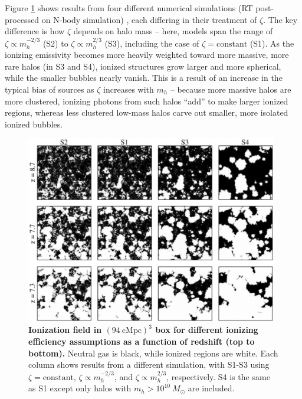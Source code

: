 Figure \ref{fig:mcquinn} shows results from four different numerical simulations (RT post-processed on N-body simulation) \cite{McQuinn2007}, each differing in their treatment of $\zeta$. The key difference is how $\zeta$ depends on halo mass -- here, models span the range of $\zeta \propto m_h^{-2/3}$ (S2) to $\zeta \propto m_h^{2/3}$ (S3), including the case of $\zeta = \mathrm{constant}$ (S1). As the ionizing emissivity becomes more heavily weighted toward more massive, more rare halos (in S3 and S4), ionized structures grow larger and more spherical, while the smaller bubbles nearly vanish. This is a result of an increase in the typical bias of sources as $\zeta$ increases with $m_h$ -- because more massive halos are more clustered, ionizing photons from such halos ``add'' to make larger ionized regions, whereas less clustered low-mass halos carve out smaller, more isolated ionized bubbles.

\begin{figure}[]
\begin{center}
\includegraphics[width=0.98\textwidth]{Mirocha/mcquinn2007_fig3.pdf}
\end{center}
\caption{{\bf Ionization field in $(94 \ \mathrm{cMpc})^3$ box for different ionizing efficiency assumptions \cite{McQuinn2007} as a function of redshift (top to bottom).} Neutral gas is black, while ionized regions are white.  Each column shows results from a different simulation, with S1-S3 using $\zeta=\mathrm{constant}$, $\zeta \propto m_h^{-2/3}$, and $\zeta \propto m_h^{2/3}$, respectively. S4 is the same as S1 except only halos with $m_h > 10^{10} \ M_{\odot}$ are included.}
\label{fig:mcquinn}
\end{figure}

